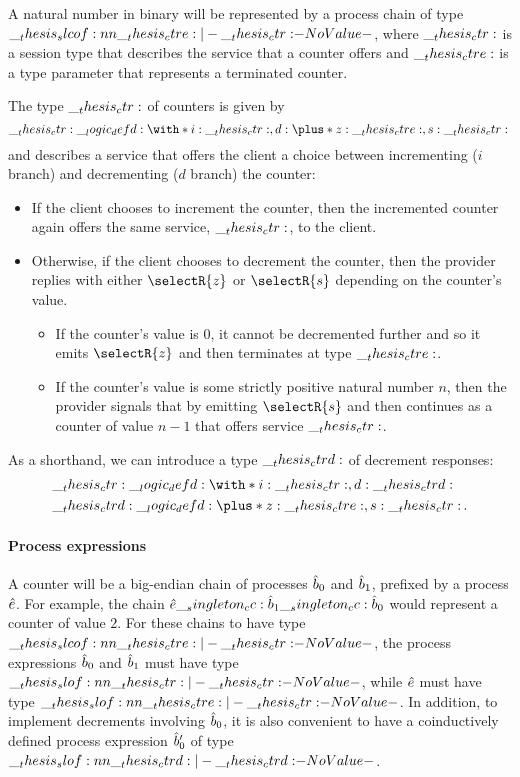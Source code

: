 A natural number in binary will be represented by a process chain of type $\slcof{\ctre |- \ctr}$, where $\__thesis_ctr:$ is a session type that 
describes the service that a counter offers
and $\__thesis_ctre:$ is a type parameter that represents a terminated counter.

The type $\__thesis_ctr:$ of counters is given by
\begin{equation*}
  \ctr \defd \with*{ i: \ctr , d: \plus*{ z: \ctre , s: \ctr } }
  \,
\end{equation*}
and describes a service that offers the client a choice between incrementing ($i$ branch) and decrementing ($d$ branch) the counter:
\begin{itemize}
\item
  If the client chooses to increment the counter, then the incremented counter again offers the same service, $\__thesis_ctr:$, to the client.
\item
  Otherwise, if the client chooses to decrement the counter, then the provider replies with either $\selectR{z}$ or $\selectR{s}$ depending on the counter's value.
  \begin{itemize}
  \item
    If the counter's value is $0$, it cannot be decremented further and so it emits $\selectR{z}$ and then terminates at type $\__thesis_ctre:$.
  \item
    If the counter's value is some strictly positive natural number $n$, then the provider signals that by emitting $\selectR{s}$ and then continues as a counter of value $n-1$ that offers service $\__thesis_ctr:$.
  \end{itemize}
\end{itemize}
As a shorthand, we can introduce a type $\__thesis_ctrd:$ of decrement responses:
\begin{equation*}
  \begin{lgathered}
    \ctr \defd \with*{ i: \ctr , d: \ctrd } \\
    \ctrd \defd \plus*{ z: \ctre , s: \ctr }
    \,.
  \end{lgathered}
\end{equation*}

\paragraph*{Process expressions}

A counter will be a big-endian chain of processes $\hat{b}_0$ and $\hat{b}_1$, prefixed by a process $\hat{e}$.
For example, the chain $\hat{e} \__singleton_cc: \hat{b}_1 \__singleton_cc: \hat{b}_0$ would represent a counter of value $2$.
For these chains to have type $\slcof{\ctre |- \ctr}$, the process expressions $\hat{b}_0$ and $\hat{b}_1$ must have type $\slof{\ctr |- \ctr}$, while $\hat{e}$ must have type $\slof{\ctre |- \ctr}$.
%
In addition, to implement decrements involving $\hat{b}_0$, it is also convenient to have a coinductively defined process expression $\hat{b}'_0$ of type $\slof{\ctrd |- \ctrd}$.

